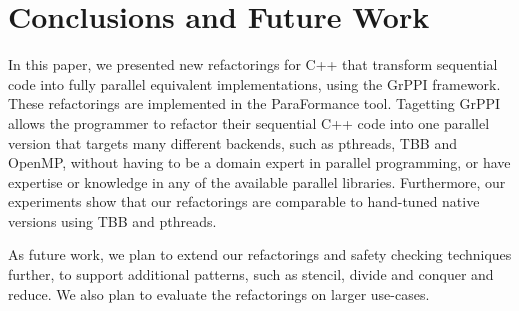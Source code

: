 





\section{Conclusions and Future Work}
In this paper, we presented new refactorings for C++ that transform sequential code into fully parallel equivalent implementations, using the GrPPI framework. These refactorings are implemented in the ParaFormance tool. Tagetting GrPPI allows the programmer to refactor their sequential C++ code into one parallel version that targets many different backends, such as pthreads, TBB and OpenMP, without having to be a domain expert in parallel programming, or have expertise or knowledge in any of the available parallel libraries.  Furthermore, our experiments show that our refactorings are comparable to hand-tuned native versions using TBB and pthreads.

As future work, we plan to extend our refactorings and safety checking techniques further, to support additional patterns, such as stencil, divide and conquer and reduce. We also plan to evaluate the refactorings on larger use-cases.









